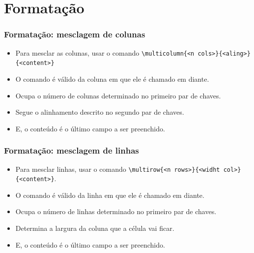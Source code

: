 \documentclass[brazilian]{beamer}
\begin{document}
\section{Formatação}
\begin{frame}[fragile]
  \frametitle{Formatação: mesclagem de colunas}

  \begin{itemize}
    \item Para mesclar as colunas, usar o comando \lstinline[style=myStyleLatex]!\multicolumn{<n cols>}{<aling>}{<content>}!
    \item O comando é válido da coluna em que ele é chamado em diante.
    \item Ocupa o número de colunas determinado no primeiro par de chaves.
    \item Segue o alinhamento descrito no segundo par de chaves.
    \item E, o conteúdo é o último campo a ser preenchido.
  \end{itemize}

\end{frame}
\begin{frame}[fragile]
  \frametitle{Formatação: mesclagem de linhas}

  \begin{itemize}
    \item Para mesclar linhas, usar o comando \lstinline[style=myStyleLatex]!\multirow{<n rows>}{<widht col>}{<content>}!.
    \item O comando é válido da linha em que ele é chamado em diante.
    \item Ocupa o número de linhas determinado no primeiro par de chaves.
    \item Determina a largura da coluna que a célula vai ficar.
    \item E, o conteúdo é o último campo a ser preenchido.
  \end{itemize}

\end{frame}
\end{document}
